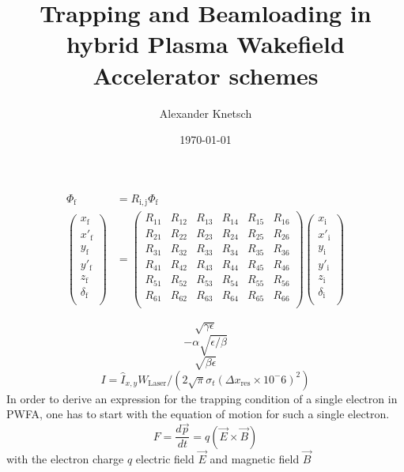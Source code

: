 \documentclass{thesis}
\title{Trapping and Beamloading in hybrid Plasma Wakefield Accelerator schemes}
\author{Alexander Knetsch}
\date{\today}
\begin{document}
\maketitle
\tableofcontents
\begin{equation}
\begin{split}
\Phi_\mathrm{f}&=R_\mathrm{i,j} \Phi_\mathrm{f} \\
\begin{pmatrix}
x_\mathrm{f}\\
x'_\mathrm{f}\\
y_\mathrm{f}\\
y'_\mathrm{f}\\
z_\mathrm{f}\\
\delta_\mathrm{f}\\
\end{pmatrix}
&=
\begin{pmatrix}
R_{11}&R_{12}&R_{13}&R_{14}&R_{15}&R_{16}\\
R_{21}&R_{22}&R_{23}&R_{24}&R_{25}&R_{26}\\
R_{31}&R_{32}&R_{33}&R_{34}&R_{35}&R_{36}\\
R_{41}&R_{42}&R_{43}&R_{44}&R_{45}&R_{46}\\
R_{51}&R_{52}&R_{53}&R_{54}&R_{55}&R_{56}\\
R_{61}&R_{62}&R_{63}&R_{64}&R_{65}&R_{66}\\
\end{pmatrix}
\begin{pmatrix}
x_\mathrm{i}\\
x'_\mathrm{i}\\
y_\mathrm{i}\\
y'_\mathrm{i}\\
z_\mathrm{i}\\
\delta_\mathrm{i}\\
\end{pmatrix}
\end{split}
\end{equation}

$$\sqrt{\gamma \epsilon}$$
$$-\alpha \sqrt{\epsilon/\beta}$$
$$\sqrt{\beta\epsilon}$$
$$I=\hat{I}_{x,y}W_\mathrm{Laser}/(2\sqrt{\pi}\sigma_t(\Delta x_\mathrm{res}\times10^-6)^2)$$
In order to derive an expression for the trapping condition of a single electron in PWFA, one has to start with the equation of motion for such a single electron. 
\begin{equation}
F=\frac{d\vec{p}}{dt}=q(\vec{E}\times \vec{B})
\end{equation}
with the electron charge $q$ electric field $\vec{E}$ and magnetic field $\vec{B}$
\end{document}
